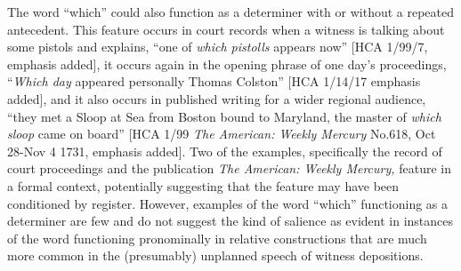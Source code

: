 The word “which” could also function as a  determiner with or without a repeated  antecedent. This feature occurs in court records when a witness is talking about some pistols and explains, “one of \textit{which pistolls} appears now” [HCA 1/99/7, emphasis added], it occurs again in the opening phrase of one day’s proceedings, “\textit{Which day} appeared personally Thomas Colston” [HCA 1/14/17 emphasis added], and it also occurs in published writing for a wider regional audience, “they met a Sloop at Sea from Boston bound to Maryland, the master of \textit{which sloop} came on board” [HCA 1/99 \textit{The American: Weekly Mercury} No.618, Oct 28-Nov 4 1731, emphasis added]. Two of the examples, specifically the record of court proceedings and the publication \textit{The American: Weekly Mercury,} feature in a formal context, potentially suggesting that the feature may have been conditioned by register. However, examples of the word “which” functioning as a determiner are few and do not suggest the kind of salience as evident in instances of the word functioning pronominally in relative constructions that are much more common in the (presumably) unplanned speech of witness depositions. 

